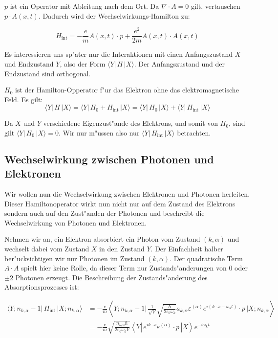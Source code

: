 $p$ ist ein Operator mit Ableitung nach dem Ort. Da $\nabla \cdot A = 0$ gilt, vertauschen $p \cdot A(x, t)$.  Dadurch wird der Wechselwirkungs-Hamilton zu:

\begin{equation*}
H_{\text{int}} = -\frac{e}{m} A(x, t) \cdot p + \frac{e^2}{2m}A(x, t) \cdot A(x, t)
\end{equation*}

Es interessieren uns sp"ater nur die Interaktionen mit einen Anfangszustand $X$ und Endzustand $Y$, also der Form $\langle Y| \, H \, |X \rangle$. Der Anfangszustand und der Endzustand sind orthogonal.

$H_0$ ist der Hamilton-Opperator f"ur das Elektron ohne das elektromagnetische Feld. Es gilt:
\begin{equation*}
\langle Y| \, H \, |X \rangle = \langle Y| \, H_0 + H_{\text{int}} \, |X \rangle = \langle Y| \, H_0 \, |X \rangle + \langle Y| \, H_{\text{int}} \, |X \rangle
\end{equation*}

Da $X$ und $Y$ verschiedene Eigenzust"ande des Elektrons, und somit von $H_0$, sind gilt $\langle Y| \, H_0 \, |X \rangle=0$. Wir nur m"ussen also nur $\langle Y| \, H_{\text{int}} \, |X \rangle$ betrachten.

\subsection{Wechselwirkung zwischen Photonen und Elektronen}

Wir wollen nun die Wechselwirkung zwischen Elektronen und Photonen herleiten. Dieser Hamiltonoperator wirkt nun nicht nur auf dem Zustand des Elektrons sondern auch auf den Zust"anden der Photonen und beschreibt die Wechselwirkung von Photonen und Elektronen.

Nehmen wir an, ein Elektron absorbiert ein Photon vom Zustand $(k,\alpha)$ und wechselt dabei vom Zustand $X$ in den Zustand $Y$. Der Einfachheit halber ber"ucksichtigen wir nur Photonen im Zustand $(k,\alpha)$. Der quadratische Term $A \cdot A$ spielt hier keine Rolle, da dieser Term nur Zustands"anderungen von $0$ oder $\pm 2$ Photonen erzeugt. Die Beschreibung der Zustands"anderung des Absorptionsprozesses ist:

\begin{equation} \label{fq:absorbtion}
\begin{split}
\langle Y; n_{k,\alpha} - 1 |\, H_{\text{int}} \,| X; n_{k,\alpha} \rangle &=
 -\frac{e}{m} \left\langle Y; n_{k,\alpha} - 1 \biggl| 
 \, \frac{1}{\sqrt{V}} \sqrt{\frac{\hbar}{2 \varepsilon_0 \omega_k}}a_{k,\alpha} \varepsilon^{(\alpha)} e^{i(k \cdot x-\omega_k t)} \cdot p \,
\biggl| X; n_{k,\alpha} \right\rangle\\
&= -\frac{e}{m} \sqrt{\frac{n_{k,\alpha} \hbar}{2 \varepsilon_0 \omega_k V}} \left\langle Y \left|
\, e^{ik \cdot x} \varepsilon^{(\alpha)} \cdot p \,
\right| X \right\rangle e^{-i\omega_k t}
\end{split}
\end{equation}

